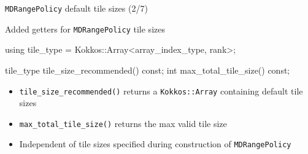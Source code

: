 
\begin{frame}[fragile]{\texttt{MDRangePolicy} default tile sizes (2/7)}

Added getters for \texttt{MDRangePolicy} tile sizes
  
\vspace{5pt}

\begin{code}
  using tile_type = Kokkos::Array<array_index_type, rank>;
  
  tile_type tile_size_recommended() const;
  int max_total_tile_size() const;
\end{code}

\vspace{10pt}

\begin{itemize}
\item \texttt{tile\_size\_recommended()} returns a \texttt{Kokkos::Array} containing default tile sizes
\item \texttt{max\_total\_tile\_size()} returns the max valid tile size

\vspace{10pt}

\item Independent of tile sizes specified during construction of \texttt{MDRangePolicy}

\end{itemize}
\end{frame}



